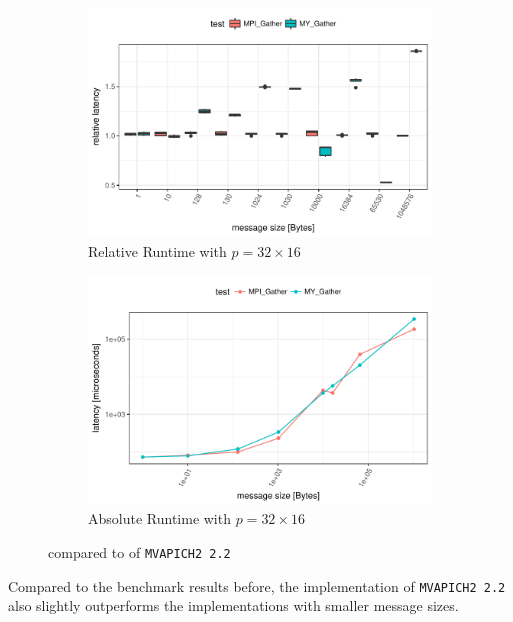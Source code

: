 \begin{figure}[H]
    \begin{subfigure}[b]{0.49\textwidth}
        \includegraphics[width=\textwidth]{../benchmarks/mpich/binom/gather_32/rel_runtime.pdf}
        \caption{Relative Runtime with $p=32 \times 16$}
        \label{fig:Gather:MPICH:Rel:32}
    \end{subfigure}
    \begin{subfigure}[b]{0.49\textwidth}
        \includegraphics[width=\textwidth]{../benchmarks/mpich/binom/gather_32/runtime.pdf}
        \caption{Absolute Runtime with $p=32 \times 16$}
        \label{fig:Gather:MPICH:Abs:32}
    \end{subfigure}
    
    \caption{\mygather compared to \mpigather of \texttt{MVAPICH2 2.2}}
\end{figure}

Compared to the benchmark results before, the \mpigather implementation of \texttt{MVAPICH2 2.2} also slightly outperforms the \mygather implementations with smaller message sizes.

